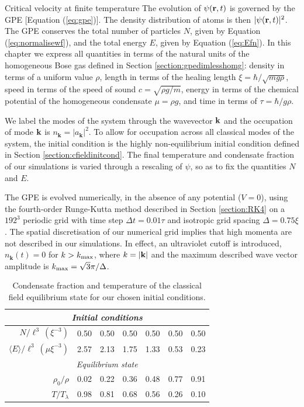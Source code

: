 \begin{chapter}{\label{cha:nonequib}Critical velocity at finite temperature}
The evolution of $\psi({\bf r},t)$ is governed by the GPE [Equation (\ref{eq:gpe})]. The density distribution of atoms is then $|\psi({\bf r},t)|^2$.
The GPE conserves the total number of particles $N$, given by Equation (\ref{eq:normalisewf}), and the total energy $E$, given by Equation (\ref{eq:Efn}). In this chapter we express all quantities in terms of the natural units of the homogeneous Bose gas defined in Section \ref{section:gpedimlesshomg}:  density in terms of a uniform value $\rho$, length in terms of the healing length $\xi=\hbar/\sqrt{m g \rho}$, speed in terms of the speed of sound $c=\sqrt{\rho g/m}$, energy in terms of the chemical potential of the homogeneous condensate $\mu=\rho g$, and time in terms of $\tau=\hbar / g \rho$.

We label the modes of the system through the wavevector ${\bf k}$ and the occupation of mode ${\bf k}$ is $n_{\mathbf{k}}=|a_{\mathbf{k}}|^2$. To allow for occupation across all classical modes of the system, the initial condition is the highly non-equilibrium initial condition defined in Section \ref{section:cfieldinitcond}.  The final temperature and condensate fraction of our simulations is varied through a rescaling of $\psi$, so as to fix the quantities $N$ and $E$.

The GPE is evolved numerically, in the absence of any potential ($V = 0$), using the fourth-order Runge-Kutta method described in Section \ref{section:RK4} on a $192^3$ periodic grid with time step $\Delta t =0.01 \tau$ and isotropic grid spacing $\Delta =0.75\xi$. The spatial discretisation of our numerical grid implies that high momenta are not described in our simulations. In effect, an ultraviolet cutoff is introduced, $n_{\mathbf{k}}(t)=0$ for $k>k_{\rm{max}}$, where $k=|{\bf k}|$ and the maximum described wave vector amplitude is $k_{\rm{max}} = \sqrt{3} \pi / \Delta$. 

\begin{table}
\centering
\begin{tabular}{rcccccc}
\multicolumn{7}{c}{\it Initial conditions} \\
\hline
\rule{0pt}{3ex}$N/\ell^3~(\xi^{-3})$           & 0.50 & 0.50 & 0.50 & 0.50 & 0.50 & 0.50 \\
$\langle E \rangle/\ell^3~(\mu \xi^{-3})$  & 2.57 & 2.13 & 1.75 & 1.33 & 0.53 & 0.23 \\
\multicolumn{7}{c}{\it Equilibrium state} \\
\hline
\rule{0pt}{3ex}$\rho_0/\rho$        & 0.02 & 0.22 & 0.36 & 0.48 & 0.77 & 0.91 \\
$T/T_\lambda$        & 0.98 & 0.81 & 0.68 & 0.56 & 0.26 & 0.10
\end{tabular}
\caption{Condensate fraction and temperature of the classical field equilibrium state for our chosen initial conditions.}
\label{tbl:cond_frac}
\end{table}


\end{chapter}
